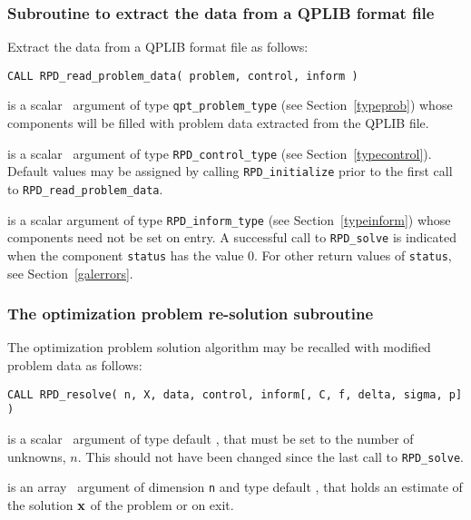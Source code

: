 \documentclass{galahad}
\newcommand{\packagename}{RPD}
\begin{document}
\begin{description}
\subsubsection{Subroutine to extract the data from a QPLIB format file}
Extract the data from a QPLIB format file as follows:

\hskip0.5in
{\tt CALL \packagename\_read\_problem\_data( problem, control, inform )}

\begin{description}

 is a scalar \intentinout\ argument of type
{\tt qpt\_problem\_type} (see Section~\ref{typeprob}) whose
components will be filled with problem data extracted from the
QPLIB file.

 is a scalar \intentin\ argument of type
{\tt \packagename\_control\_type}
(see Section~\ref{typecontrol}).
Default values may be assigned by calling {\tt \packagename\_initialize}
prior to the first call to {\tt \packagename\_read\_problem\_data}.

 is a scalar \intentinout argument of type
{\tt \packagename\_inform\_type}
(see Section~\ref{typeinform}) whose components need not be set on entry.
A successful call to
{\tt \packagename\_solve}
is indicated when the  component {\tt status} has the value 0.
For other return values of {\tt status}, see Section~\ref{galerrors}.

\end{description}


\subsubsection{The optimization problem re-solution subroutine}
The optimization problem solution algorithm may be recalled
with modified problem data as follows:

\hskip0.5in
{\tt CALL \packagename\_resolve( n, X, data, control, inform[, C, f, delta, sigma, p] )}

\begin{description}

 is a scalar \intentin\ argument of type default \integer, that must be
set to the number of unknowns, $n$. This should not have been changed
since the last call to {\tt \packagename\_solve}.

 is an array \intentout\ argument of dimension {\tt n} and
type default \realdp, that holds an estimate of the solution ${\mathbf{x}}$
of the problem  or  on exit.


\end{description}
\end{description}
\end{document}
